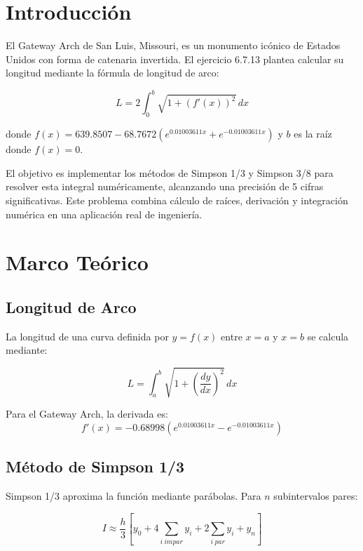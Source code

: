 \documentclass[conference]{IEEEtran}
\begin{document}
\section{Introducción}

El Gateway Arch de San Luis, Missouri, es un monumento icónico de Estados Unidos con forma de catenaria invertida. El ejercicio 6.7.13 plantea calcular su longitud mediante la fórmula de longitud de arco:

\begin{equation}
L = 2\int_{0}^{b} \sqrt{1 + \left(f'(x)\right)^2} \, dx
\end{equation}

donde $f(x) = 639.8507 - 68.7672\left(e^{0.01003611x} + e^{-0.01003611x}\right)$ y $b$ es la raíz donde $f(x) = 0$.

El objetivo es implementar los métodos de Simpson 1/3 y Simpson 3/8 para resolver esta integral numéricamente, alcanzando una precisión de 5 cifras significativas. Este problema combina cálculo de raíces, derivación y integración numérica en una aplicación real de ingeniería.

\section{Marco Teórico}

\subsection{Longitud de Arco}

La longitud de una curva definida por $y = f(x)$ entre $x = a$ y $x = b$ se calcula mediante:

\begin{equation}
L = \int_{a}^{b} \sqrt{1 + \left(\frac{dy}{dx}\right)^2} \, dx
\end{equation}

Para el Gateway Arch, la derivada es:
\begin{equation}
f'(x) = -0.68998\left(e^{0.01003611x} - e^{-0.01003611x}\right)
\end{equation}

\subsection{Método de Simpson 1/3}

Simpson 1/3 aproxima la función mediante parábolas. Para $n$ subintervalos pares:

\begin{equation}
I \approx \frac{h}{3}\left[y_0 + 4\sum_{i\ impar}y_i + 2\sum_{i\ par}y_i + y_n\right]
\end{equation}
\end{document}
